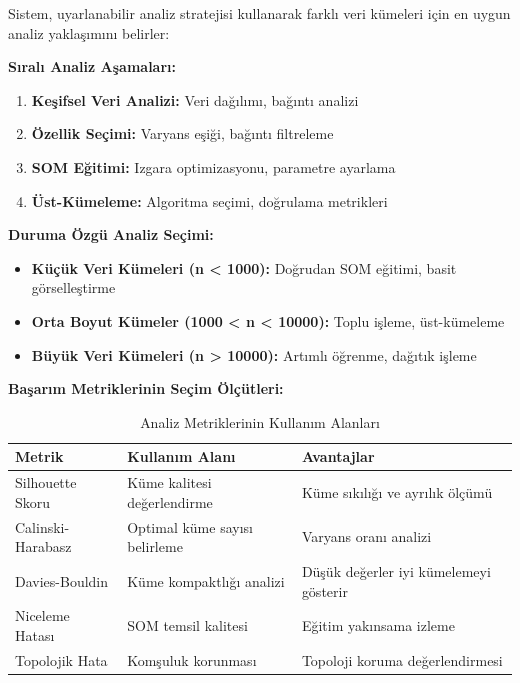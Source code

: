 Sistem, uyarlanabilir analiz stratejisi kullanarak farklı veri kümeleri için en uygun analiz yaklaşımını belirler:

\textbf{Sıralı Analiz Aşamaları:}

\begin{enumerate}
    \item \textbf{Keşifsel Veri Analizi:} Veri dağılımı, bağıntı analizi
    \item \textbf{Özellik Seçimi:} Varyans eşiği, bağıntı filtreleme
    \item \textbf{SOM Eğitimi:} Izgara optimizasyonu, parametre ayarlama
    \item \textbf{Üst-Kümeleme:} Algoritma seçimi, doğrulama metrikleri
\end{enumerate}

\textbf{Duruma Özgü Analiz Seçimi:}

\begin{itemize}
    \item \textbf{Küçük Veri Kümeleri (n < 1000):} Doğrudan SOM eğitimi, basit görselleştirme
    \item \textbf{Orta Boyut Kümeler (1000 < n < 10000):} Toplu işleme, üst-kümeleme
    \item \textbf{Büyük Veri Kümeleri (n > 10000):} Artımlı öğrenme, dağıtık işleme
\end{itemize}

\textbf{Başarım Metriklerinin Seçim Ölçütleri:}

\begin{table}[!ht]
\centering
\caption{Analiz Metriklerinin Kullanım Alanları}
\label{tab:metrics_usage}
\begin{tabular}{|l|p{}|p{}|}
\hline
\textbf{Metrik} & \textbf{Kullanım Alanı} & \textbf{Avantajlar} \\
\hline
Silhouette Skoru & Küme kalitesi değerlendirme & Küme sıkılığı ve ayrılık ölçümü \\
\hline
Calinski-Harabasz & Optimal küme sayısı belirleme & Varyans oranı analizi \\
\hline
Davies-Bouldin & Küme kompaktlığı analizi & Düşük değerler iyi kümelemeyi gösterir \\
\hline
Niceleme Hatası & SOM temsil kalitesi & Eğitim yakınsama izleme \\
\hline
Topolojik Hata & Komşuluk korunması & Topoloji koruma değerlendirmesi \\
\hline
\end{tabular}
\end{table}

